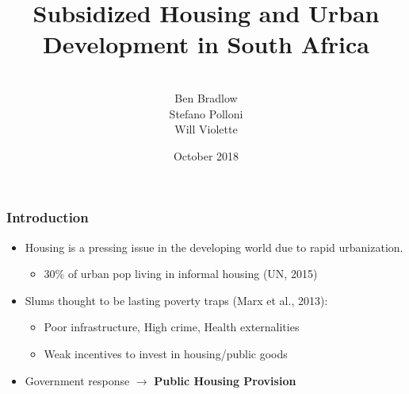 \documentclass[aspectratio=32]{beamer}
\title{Subsidized Housing and Urban Development in South Africa} %
\author{\\Ben Bradlow \\ Stefano Polloni\\ Will Violette}
\date{October 2018} %
\begin{document}
\beamertemplatenavigationsymbolsempty

\begin{frame}
\titlepage %
\end{frame}



\begin{frame}
\frametitle{Introduction}
\centering

\begin{itemize}
  \item<1-> Housing is a pressing issue in the developing world due to rapid urbanization. 
  \begin{itemize}
  \item 30\% of urban pop living in informal housing (UN, 2015)
  \end{itemize}
  \vspace{2mm}
  \item<2-> Slums thought to be lasting poverty traps (Marx et al., 2013): 
    \begin{itemize}
      \vspace{1mm}
      \item Poor infrastructure, High crime, Health externalities
      \vspace{1mm}
      \item Weak incentives to invest in housing/public goods
  \vspace{2mm}
    \end{itemize}
  \item<3->  Government response $\rightarrow$ \textbf{Public Housing Provision} 
\end{itemize}


\end{frame}
\end{document}
